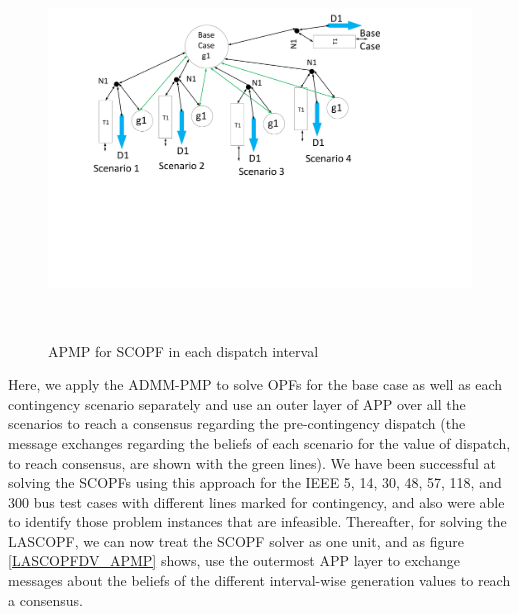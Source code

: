 \documentclass[preprint,12pt,3p]{elsarticle}
\begin{document}
\begin{figure}
\begin{center}
\includegraphics[height=10cm,width=20cm]{SCOPF_Prox_Fig.pdf}
\vspace*{-4cm}
\caption{APMP for SCOPF in each dispatch interval}
\label{SCOPF_APMP}
\end{center}
\end{figure}
Here, we apply the ADMM-PMP to solve OPFs for the base case as well as each contingency scenario separately and use an outer layer of APP over all the scenarios to reach a consensus regarding the pre-contingency dispatch (the message exchanges regarding the beliefs of each scenario for the value of dispatch, to reach consensus, are shown with the green lines). We have been successful at solving the SCOPFs using this approach for the IEEE 5, 14, 30, 48, 57, 118, and 300 bus test cases with different lines marked for contingency, and also were able to identify those problem instances that are infeasible. Thereafter, for solving the LASCOPF, we can now treat the SCOPF solver as one unit, and as figure \ref{LASCOPFDV_APMP} shows, use the outermost APP layer to exchange messages about the beliefs of the different interval-wise generation values to reach a consensus. 
\end{document}
